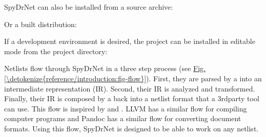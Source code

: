 \documentclass[letterpaper,10pt,english,openany,oneside]{sphinxmanual}
\begin{document}
\begin{sphinxVerbatim}[commandchars=\\\{\}]
   \PYG{p}{[}\PYG{p}{]}
\end{sphinxVerbatim}

SpyDrNet can also be installed from a source archive:

\begin{sphinxVerbatim}[commandchars=\\\{\}]
   
\end{sphinxVerbatim}

Or a built distribution:

\begin{sphinxVerbatim}[commandchars=\\\{\}]
   
\end{sphinxVerbatim}

If a development environment is desired, the project can be installed in editable mode from the project directory:

\begin{sphinxVerbatim}[commandchars=\\\{\}]
    
\end{sphinxVerbatim}


Netlists flow through SpyDrNet in a three step process (see \hyperref[\detokenize{reference/introduction:fig-flow}]{Fig.\@ \ref{\detokenize{reference/introduction:fig-flow}}}). First, they are parsed by a  into an intermediate representation (IR). Second, their IR is analyzed and transformed. Finally, their IR is composed by a  back into a netlist format that a 3rd\sphinxhyphen{}party tool can use. This flow is inspired by  and . LLVM has a similar flow for compiling computer programs and Pandoc has a similar flow for converting document formats. Using this flow, SpyDrNet is designed to be able to work on any netlist.
\end{document}
